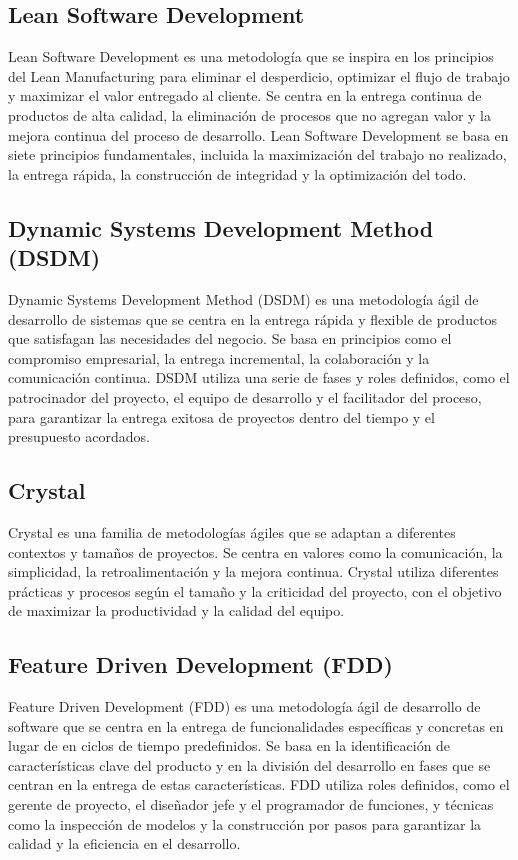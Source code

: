 \subsection{Lean Software Development}
	Lean Software Development es una metodología que se inspira en los principios del Lean Manufacturing para eliminar el desperdicio, optimizar el flujo de trabajo y maximizar el valor entregado al cliente. Se centra en la entrega continua de productos de alta calidad, la eliminación de procesos que no agregan valor y la mejora continua del proceso de desarrollo. Lean Software Development se basa en siete principios fundamentales, incluida la maximización del trabajo no realizado, la entrega rápida, la construcción de integridad y la optimización del todo.

\subsection{Dynamic Systems Development Method (DSDM)}
	Dynamic Systems Development Method (DSDM) es una metodología ágil de desarrollo de
	sistemas que se centra en la entrega rápida y flexible de productos que satisfagan las necesidades del negocio. Se basa en principios como el compromiso empresarial, la entrega incremental, la colaboración y la comunicación continua. DSDM utiliza una serie de fases y roles definidos, como el patrocinador del proyecto, el equipo de desarrollo y el facilitador del proceso, para garantizar la entrega exitosa de proyectos dentro del tiempo y el presupuesto acordados.

\subsection{Crystal}
	Crystal es una familia de metodologías ágiles que se adaptan a diferentes contextos y
	tamaños de proyectos. Se centra en valores como la comunicación, la simplicidad, la
	retroalimentación y la mejora continua. Crystal utiliza diferentes prácticas y procesos según el tamaño y la criticidad del proyecto, con el objetivo de maximizar la productividad y la calidad del equipo.

\subsection{Feature Driven Development (FDD)}
	Feature Driven Development (FDD) es una metodología ágil de desarrollo de software que se centra en la entrega de funcionalidades específicas y concretas en lugar de en ciclos de tiempo predefinidos. Se basa en la identificación de características clave del producto y en la división del desarrollo en fases que se centran en la entrega de estas características. FDD utiliza roles definidos, como el gerente de proyecto, el diseñador jefe y el programador de funciones, y técnicas como la inspección de modelos y la construcción por pasos para garantizar la calidad y la eficiencia en el desarrollo.

